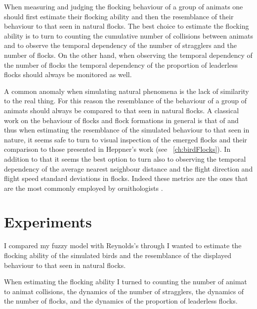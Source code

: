 When measuring and judging the flocking behaviour of a group of animats one should first estimate their flocking ability and then the resemblance of their behaviour to that seen in natural flocks. The best choice to estimate the flocking ability is to turn to counting the cumulative number of collisions between animats and to observe the temporal dependency of the number of stragglers and the number of flocks.  On the other hand, when observing the temporal dependency of the number of flocks the temporal dependency of the proportion of leaderless flocks should always be monitored as well.

A common anomaly when simulating natural phenomena is the lack of similarity to the real thing. For this reason the resemblance of the behaviour of a group of animats should always be compared to that seen in natural flocks. A classical work on the behaviour of flocks and flock formations in general is that of  and thus when estimating the resemblance of the simulated behaviour to that seen in nature, it seems safe to turn to visual inspection of the emerged flocks and their comparison to those presented in Heppner's work (see \chaptername~\ref{ch:birdFlocks}). In addition to that it seems the best option to turn also to observing the temporal dependency of the average nearest neighbour distance and the flight direction and flight speed standard deviations in flocks. Indeed these metrics are the ones that are the most commonly employed by ornithologists \cite{gould:1974,heppner:1985,pomeroy:1992}.

\section{Experiments}
\label{sec:analysis:comparison}
I compared my fuzzy model with Reynolds's through  I wanted to estimate the flocking ability of the simulated birds and the resemblance of the displayed behaviour to that seen in natural flocks. 

When estimating the flocking ability I turned to counting the number of animat to animat collisions, the dynamics of the number of stragglers, the dynamics of the number of flocks, and the dynamics of the proportion of leaderless flocks. 


